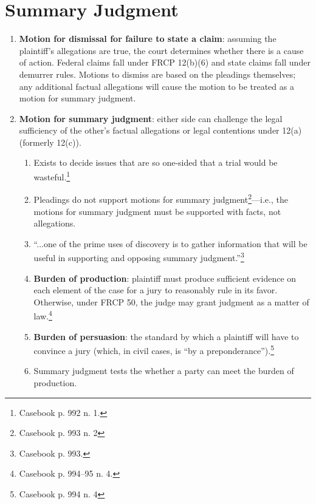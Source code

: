 \section{Summary Judgment}

\begin{enumerate}
    \item \textbf{Motion for dismissal for failure to state a claim}: assuming 
    the plaintiff's allegations are true, the court determines whether there 
    is a cause of action. Federal claims fall under FRCP 12(b)(6) and state 
    claims fall under demurrer rules. Motions to dismiss are based on the 
    pleadings themselves; any additional factual allegations will cause the 
    motion to be treated as a motion for summary judgment.
    \item \textbf{Motion for summary judgment}: either side can challenge the 
    legal sufficiency of the other's factual allegations or legal contentions 
    under 12(a) (formerly 12(c)).
    \begin{enumerate}
        \item Exists to decide issues that are so one-sided that a trial would 
        be wasteful.\footnote{Casebook p. 992 n. 1.}
        \item Pleadings do not support motions for summary 
        judgment\footnote{Casebook p. 993 n. 2}---i.e., the motions for 
        summary judgment must be supported with facts, not allegations.
        \item ``...one of the prime uses of discovery is to gather information 
        that will be useful in supporting and opposing summary 
        judgment.''\footnote{Casebook p. 993.}
        \item \textbf{Burden of production}: plaintiff must produce sufficient 
        evidence on each element of the case for a jury to reasonably rule in 
        its favor. Otherwise, under FRCP 50, the judge may grant judgment as a 
        matter of law.\footnote{Casebook p. 994--95 n. 4.}
        \item \textbf{Burden of persuasion}: the standard by which a plaintiff 
        will have to convince a jury (which, in civil cases, is ``by a 
        preponderance'').\footnote{Casebook p. 994 n. 4}
        \item Summary judgment tests the whether a party can meet the burden 
        of production.
    \end{enumerate}
\end{enumerate}


